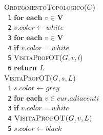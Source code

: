 \documentclass[10pt,landscape]{article}
\begin{document}
\begin{multicols*}{4}
                \begin{multicols}{2}
                        \textsc{OrdinamentoTopologico($G$)} \\ [3pt]
                        \verb| 1|\hspace*{0.5em} $\textbf{for each } v \in \textbf{V}$\\
                        \verb| 2|\hspace*{1.5em} $v.color \leftarrow white$\\
                        \verb| 3|\hspace*{0.5em} $\textbf{for each } v \in \textbf{V}$\\
                        \verb| 4|\hspace*{1.5em} $\textbf{if } v.color = white$\\
                        \verb| 5|\hspace*{2.5em} \textsc{VisitaProfOT($G,v,l$)}\\
                        \verb| 6|\hspace*{0.5em} \textbf{return $L$}\\
                        \columnbreak
                        \textsc{VisitaProfOT($G,s,L$)} \\ [3pt]
                        \verb| 1|\hspace*{0.5em} $s.color \leftarrow grey$\\
                        \verb| 2|\hspace*{0.5em} $\textbf{for each } v \in cur.adiacenti$\\
                        \verb| 3|\hspace*{1.5em} $\textbf{if } v.color = white$\\
                        \verb| 4|\hspace*{2.5em} $\textsc{VisitaProfOT($G,v,L$)}$\\
                        \verb| 5|\hspace*{0.5em} $s.color \leftarrow black$\\

\end{multicols}
\end{multicols*}
\end{document}
